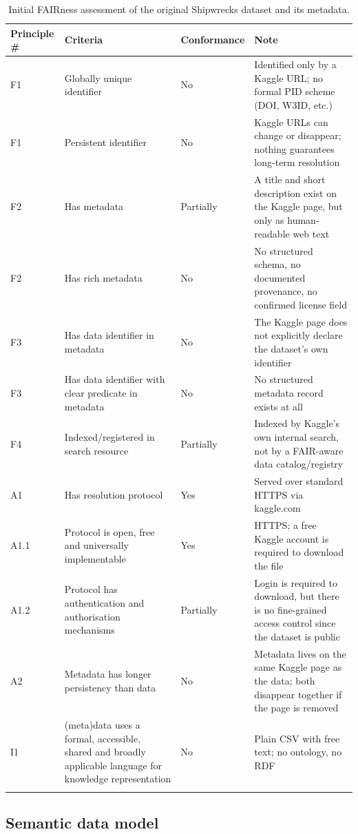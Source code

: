 \begin{longtable}{p{1.6cm} p{5.3cm} p{2.0cm} p{5.3cm}}
\toprule
\textbf{Principle \#} & \textbf{Criteria} & \textbf{Conformance} & \textbf{Note} \\
\midrule
\endhead
F1 & Globally unique identifier & No & Identified only by a Kaggle URL; no formal PID scheme (DOI, W3ID, etc.) \\
F1 & Persistent identifier & No & Kaggle URLs can change or disappear; nothing guarantees long-term resolution \\
F2 & Has metadata & Partially & A title and short description exist on the Kaggle page, but only as human-readable web text \\
F2 & Has rich metadata & No & No structured schema, no documented provenance, no confirmed license field \\
F3 & Has data identifier in metadata & No & The Kaggle page does not explicitly declare the dataset's own identifier \\
F3 & Has data identifier with clear predicate in metadata & No & No structured metadata record exists at all \\
F4 & Indexed/registered in search resource & Partially & Indexed by Kaggle's own internal search, not by a FAIR-aware data catalog/registry \\
A1 & Has resolution protocol & Yes & Served over standard HTTPS via kaggle.com \\
A1.1 & Protocol is open, free and universally implementable & Yes & HTTPS; a free Kaggle account is required to download the file \\
A1.2 & Protocol has authentication and authorisation mechanisms & Partially & Login is required to download, but there is no fine-grained access control since the dataset is public \\
A2 & Metadata has longer persistency than data & No & Metadata lives on the same Kaggle page as the data; both disappear together if the page is removed \\
I1 & (meta)data uses a formal, accessible, shared and broadly applicable language for knowledge representation & No & Plain CSV with free text; no ontology, no RDF \\
\bottomrule
\caption{Initial FAIRness assessment of the original Shipwrecks dataset and its metadata.}
\label{tab:fairness-initial}
\end{longtable}

\subsection{Semantic data model}

